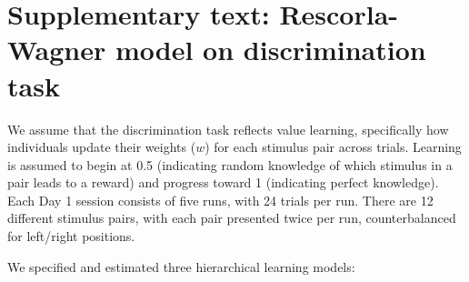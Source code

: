 \documentclass[a4paper,12pt]{article}
\begin{document}
\section*{Supplementary text: Rescorla-Wagner model on discrimination task}

We assume that the discrimination task reflects value learning, specifically how individuals update their weights (\(w\)) for each stimulus pair across trials. Learning is assumed to begin at 0.5 (indicating random knowledge of which stimulus in a pair leads to a reward) and progress toward 1 (indicating perfect knowledge). Each Day 1 session consists of five runs, with 24 trials per run. There are 12 different stimulus pairs, with each pair presented twice per run, counterbalanced for left/right positions. 

We specified and estimated three hierarchical learning models:
\end{document}
